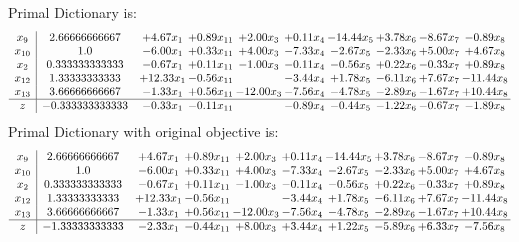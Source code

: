 \documentclass[9pt]{article}
\begin{document}
Primal Dictionary is:
\[\begin{array}{c| c c@{\hskip 2pt} c@{\hskip 2pt} c@{\hskip 2pt} c@{\hskip 2pt} c@{\hskip 2pt} c@{\hskip 2pt} c@{\hskip 2pt} c@{\hskip 2pt} }
 x_{9}   &  2.66666666667 & +  4.67 x_{1} & +  0.89 x_{11} & +  2.00 x_{3} & +  0.11 x_{4} & -14.44 x_{5} & +  3.78 x_{6} & -8.67 x_{7} & -0.89 x_{8}\\
 x_{10}   &  1.0 & -6.00 x_{1} & +  0.33 x_{11} & +  4.00 x_{3} & -7.33 x_{4} & -2.67 x_{5} & -2.33 x_{6} & +  5.00 x_{7} & +  4.67 x_{8}\\
 x_{2}   &  0.333333333333 & -0.67 x_{1} & +  0.11 x_{11} & -1.00 x_{3} & -0.11 x_{4} & -0.56 x_{5} & +  0.22 x_{6} & -0.33 x_{7} & +  0.89 x_{8}\\
 x_{12}   &  1.33333333333 & + 12.33 x_{1} & -0.56 x_{11} &   & -3.44 x_{4} & +  1.78 x_{5} & -6.11 x_{6} & +  7.67 x_{7} & -11.44 x_{8}\\
 x_{13}   &  3.66666666667 & -1.33 x_{1} & +  0.56 x_{11} & -12.00 x_{3} & -7.56 x_{4} & -4.78 x_{5} & -2.89 x_{6} & -1.67 x_{7} & + 10.44 x_{8}\\
\hline
z    &  -0.333333333333 & -0.33 x_{1} & -0.11 x_{11} &   & -0.89 x_{4} & -0.44 x_{5} & -1.22 x_{6} & -0.67 x_{7} & -1.89 x_{8}\\
\end{array}\]
Primal Dictionary with original objective is:
\[\begin{array}{c| c c@{\hskip 2pt} c@{\hskip 2pt} c@{\hskip 2pt} c@{\hskip 2pt} c@{\hskip 2pt} c@{\hskip 2pt} c@{\hskip 2pt} c@{\hskip 2pt} }
 x_{9}   &  2.66666666667 & +  4.67 x_{1} & +  0.89 x_{11} & +  2.00 x_{3} & +  0.11 x_{4} & -14.44 x_{5} & +  3.78 x_{6} & -8.67 x_{7} & -0.89 x_{8}\\
 x_{10}   &  1.0 & -6.00 x_{1} & +  0.33 x_{11} & +  4.00 x_{3} & -7.33 x_{4} & -2.67 x_{5} & -2.33 x_{6} & +  5.00 x_{7} & +  4.67 x_{8}\\
 x_{2}   &  0.333333333333 & -0.67 x_{1} & +  0.11 x_{11} & -1.00 x_{3} & -0.11 x_{4} & -0.56 x_{5} & +  0.22 x_{6} & -0.33 x_{7} & +  0.89 x_{8}\\
 x_{12}   &  1.33333333333 & + 12.33 x_{1} & -0.56 x_{11} &   & -3.44 x_{4} & +  1.78 x_{5} & -6.11 x_{6} & +  7.67 x_{7} & -11.44 x_{8}\\
 x_{13}   &  3.66666666667 & -1.33 x_{1} & +  0.56 x_{11} & -12.00 x_{3} & -7.56 x_{4} & -4.78 x_{5} & -2.89 x_{6} & -1.67 x_{7} & + 10.44 x_{8}\\
\hline
z    &  -1.33333333333 & -2.33 x_{1} & -0.44 x_{11} & +  8.00 x_{3} & +  3.44 x_{4} & +  1.22 x_{5} & -5.89 x_{6} & +  6.33 x_{7} & -7.56 x_{8}\\
\end{array}\]
\end{document}
